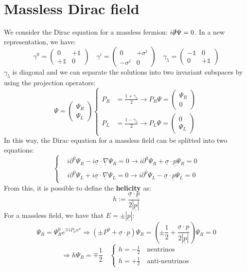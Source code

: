 \documentclass[../main.tex]{subfiles}
\begin{document}
\section{Massless Dirac field}
We consider the Dirac equation for a massless fermion: $i\slashed{\partial}\Psi=0$. In a new representation, we have:
\[
\gamma^0=\left(\begin{array}{cc}
    0 & +\mathbb{1} \\
    +\mathbb{1} & 0
\end{array}\right)
\quad 
\gamma^i=\left(\begin{array}{cc}
    0 & +\sigma^i \\
    -\sigma^i & 0
\end{array}\right)
\quad
\gamma_5=\left(\begin{array}{cc}
    -\mathbb{1} & 0 \\
    0 & +\mathbb{1}
\end{array}\right)
\]
$\gamma_5$ is diagonal and we can separate the solutions into two invariant subspaces by using the projection operators:
\[
\Psi=\left(\begin{array}{c}
\Psi_R\\
\Psi_L
\end{array}\right)
\left\{
\begin{aligned}
P_R&=\frac{1+\gamma_5}{2}\xrightarrow[]{}P_R\Psi=\left(\begin{array}{c}
\Psi_R\\
0
\end{array}\right) \\ 
P_L&=\frac{1-\gamma_5}{2}\xrightarrow[]{}P_L\Psi=\left(\begin{array}{c}
0\\
\Psi_L
\end{array}\right)
\end{aligned}
\right.
\]
In this way, the Dirac equation for a massless field can be splitted into two equations:
\[
\left\{
\begin{aligned}
&i\partial^0\Psi_R-i\underline{\sigma}\cdot\underline{\nabla}\Psi_R=0\xrightarrow[]{}i\partial^0\Psi_R+\underline{\sigma}\cdot\underline{p}\Psi_R=0\\
&i\partial^0\Psi_L+i\underline{\sigma}\cdot\underline{\nabla}\Psi_L=0\xrightarrow[]{}i\partial^0\Psi_L-\underline{\sigma}\cdot\underline{p}\Psi_L=0
\end{aligned}
\right.
\]
From this, it is possible to define the \textbf{helicity} as:
\[
h:=\frac{\underline{\sigma}\cdot\underline{p}}{2|\underline{p}|}
\]
For a massless field, we have that $E=\pm|\underline{p}|$:
\[
\Psi_R=\Psi^0_Re^{\mp iP_\mu x^\mu}\Rightarrow(\pm P^0+\underline{\sigma}\cdot\underline{p})\Psi_R=\left(\pm\frac{1}{2}+\frac{\underline{\sigma}\cdot\underline{p}}{2|\underline{p}|}\right)\Psi_R=0
\]
\[
\Rightarrow h\Psi_R=\mp\frac{1}{2}\quad\begin{cases}
h=-\frac{1}{2} \quad \text{neutrinos}\\
h=+\frac{1}{2} \quad \text{anti-neutrinos}
\end{cases}
\]
\end{document}
